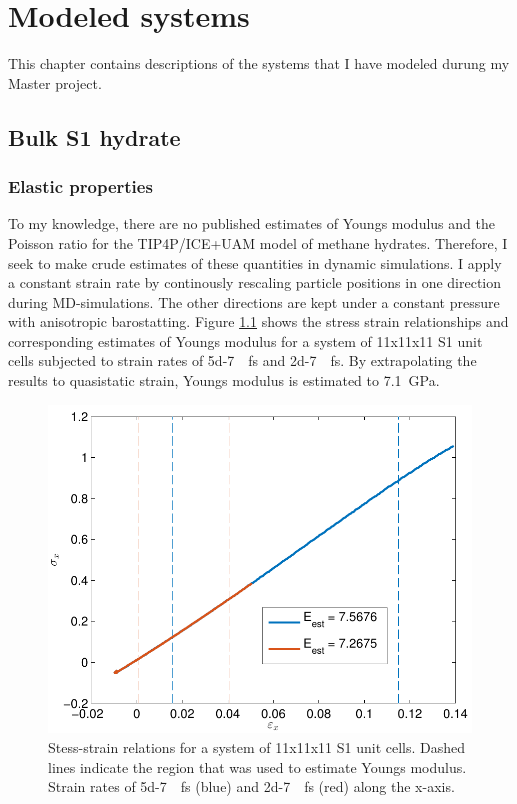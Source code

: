 
\chapter{Modeled systems}
This chapter contains descriptions of the systems that I have modeled durung my Master project. 
\section{Bulk S1 hydrate}
\subsection{Elastic properties}
To my knowledge, there are no published estimates of Youngs modulus and the Poisson ratio for the TIP4P/ICE+UAM model of methane hydrates. Therefore, I seek to make crude estimates of these quantities in dynamic simulations. I apply a constant strain rate by continously rescaling particle positions in one direction during MD-simulations. The other directions are kept under a constant pressure with anisotropic barostatting. Figure \ref{fig:stress_strain_11_11_11_tip4p_ice_uam} shows the stress strain relationships and corresponding estimates of Youngs modulus for a system of 11x11x11 S1 unit cells subjected to strain rates of \SI{5d-7}{\per\femto\second} and \SI{2d-7}{\per\femto\second}. By extrapolating the results to quasistatic strain, Youngs modulus is estimated to \SI{7.1}{\giga\pascal}.

\begin{figure}
\includegraphics[width=12cm]{../figures/thesis/stress_strain_11_11_11_tip4p_ice_uam.pdf}
\caption{Stess-strain relations for a system of 11x11x11 S1 unit cells. Dashed lines indicate the region that was used to estimate Youngs modulus. Strain rates of \SI{5d-7}{\per\femto\second} (blue) and \SI{2d-7}{\per\femto\second} (red) along the x-axis.}
\label{fig:stress_strain_11_11_11_tip4p_ice_uam}
\end{figure}

